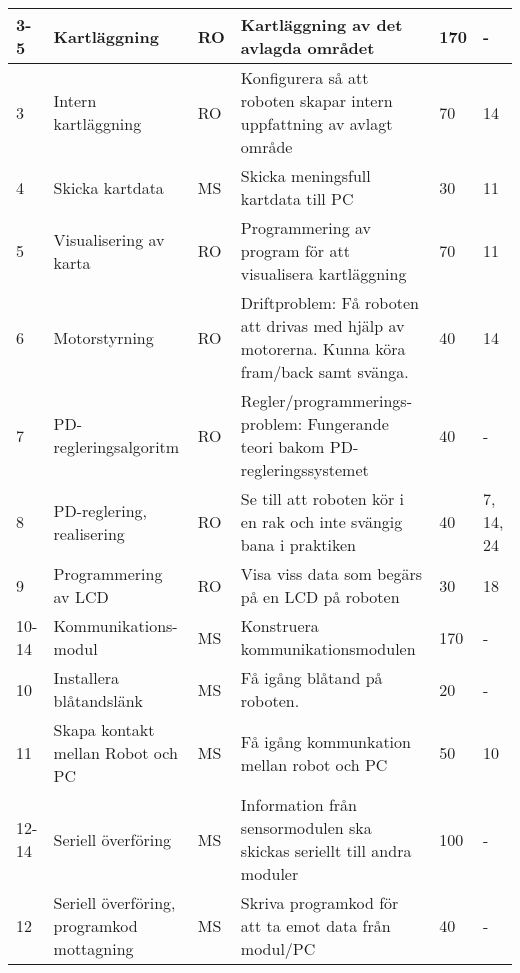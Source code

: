 \documentclass[11pt]{article}
\begin{document}
\begin{flushleft}
\begin{longtable}{|l|p{.20\linewidth}|l|p{.30\linewidth}|p{.10\linewidth}|p{.10\linewidth}|}
3-5 &
Kartläggning &
RO &
Kartläggning av det avlagda området &
170 &
-\\ \hline

3 &
Intern kartläggning &
RO &
Konfigurera så att roboten skapar intern uppfattning av avlagt område &
70 &
14 \\ \hline

4 &
Skicka kartdata &
MS &
Skicka meningsfull kartdata till PC&
30 &
11 \\ \hline

5 &
Visualisering av karta &
RO &
Programmering av program för att visualisera kartläggning &
70 &
11 \\ \hline
 
6 &
Motorstyrning &
RO &
Driftproblem: Få roboten att drivas med hjälp av motorerna. Kunna köra fram/back samt svänga. &
40 &
14 \\ \hline
 
 
7 &
PD-regleringsalgoritm &
RO &
Regler/programmerings-problem: Fungerande teori bakom PD-regleringssystemet &
40 &
- \\ \hline

8 &
PD-reglering, realisering &
RO &
Se till att roboten kör i en rak och inte svängig bana i praktiken &
40 &
7, 14, 24 \\ \hline
 
 
9 &
Programmering av LCD &
RO &
Visa viss data som begärs på en LCD på roboten &
30 &
18 \\ \hline
 
10-14 &
Kommunikations-modul &
MS &
Konstruera kommunikationsmodulen &
170 &
- \\ \hline

10 &
Installera blåtandslänk &
MS &
Få igång blåtand på roboten. &
20 &
- \\ \hline
 
11 &
Skapa kontakt mellan Robot och PC &
MS &
Få igång kommunkation mellan robot och PC &
50 &
10 \\ \hline
 

12-14 &
Seriell överföring&
MS &
Information från sensormodulen ska skickas seriellt till andra moduler&
100 &
- \\ \hline

12 &
Seriell överföring, programkod mottagning&
MS &
Skriva programkod för att ta emot data från modul/PC&
40 &
- \\ \hline


\end{longtable}
\end{flushleft}
\end{document}
